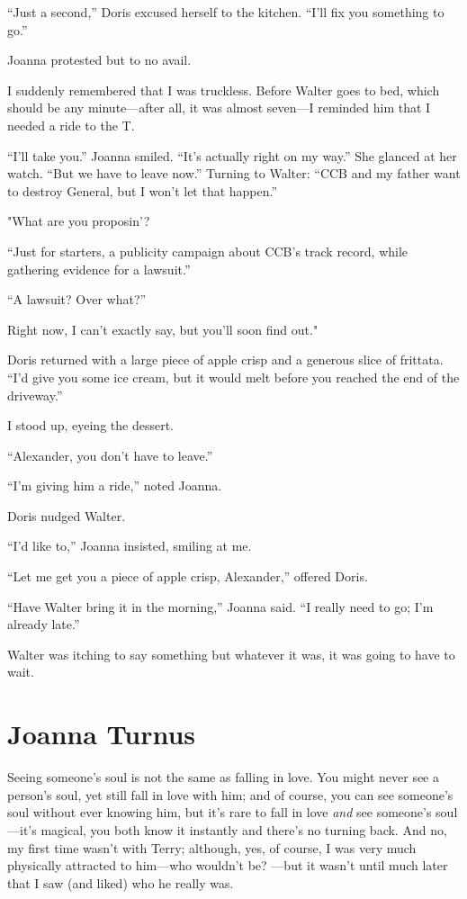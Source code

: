 ``Just a second,'' Doris excused herself to the kitchen. ``I'll fix you
something to go.''

Joanna protested but to no avail.

I suddenly remembered that I was truckless. Before Walter goes to bed,
which should be any minute---after all, it was almost seven---I reminded
him that I needed a ride to the T.

``I'll take you.'' Joanna smiled. ``It's actually right on my way.'' She
glanced at her watch. ``But we have to leave now.'' Turning to Walter:
``CCB and my father want to destroy General, but I won't let that
happen.''

"What are you proposin'?

``Just for starters, a publicity campaign about CCB's track record,
while gathering evidence for a lawsuit.''

``A lawsuit? Over what?''

Right now, I can't exactly say, but you'll soon find out."

Doris returned with a large piece of apple crisp and a generous slice of
frittata. ``I'd give you some ice cream, but it would melt before you
reached the end of the driveway.''

I stood up, eyeing the dessert.

``Alexander, you don't have to leave.''

``I'm giving him a ride,'' noted Joanna.

Doris nudged Walter.

``I'd like to,'' Joanna insisted, smiling at me.

``Let me get you a piece of apple crisp, Alexander,'' offered Doris.

``Have Walter bring it in the morning,'' Joanna said. ``I really need to
go; I'm already late.''

Walter was itching to say something but whatever it was, it was going to
have to wait.

\chapter{Joanna Turnus}

\titlemark

Seeing someone's soul is not the same as falling in love. You might
never see a person's soul, yet still fall in love with him; and of
course, you can see someone's soul without ever knowing him, but it's
rare to fall in love \emph{and} see someone's soul---it's magical, you
both know it instantly and there's no turning back. And no, my first
time wasn't with Terry; although, yes, of course, I was very much
physically attracted to him---who wouldn't be? ---but it wasn't until
much later that I saw (and liked) who he really was.

